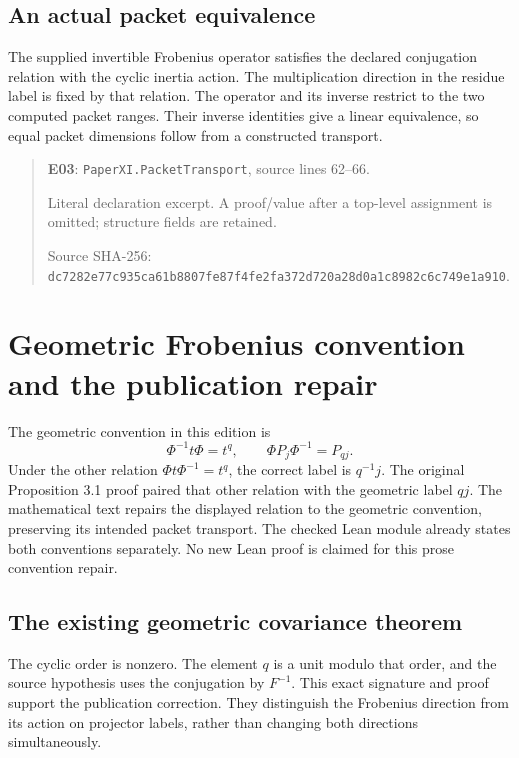 \documentclass[10pt,oneside]{book}
\begin{document}

\subsection{An actual packet equivalence}
\label{guide:E03}
The supplied invertible Frobenius operator satisfies the declared conjugation relation with the cyclic inertia action. The multiplication direction in the residue label is fixed by that relation.
The operator and its inverse restrict to the two computed packet ranges. Their inverse identities give a linear equivalence, so equal packet dimensions follow from a constructed transport.

\begin{quote}\footnotesize\textbf{E03}: \nolinkurl{PaperXI.PacketTransport}, source lines 62--66.\par Literal declaration excerpt. A proof/value after a top-level assignment is omitted; structure fields are retained.\par Source SHA-256: {\scriptsize\texttt{dc7282e77c935ca61b8807fe87f4fe2fa372d720a28d0a1c8982c6c749e1a910}}.\end{quote}


\section{Geometric Frobenius convention and the publication repair}
The geometric convention in this edition is
\[
 \Phi^{-1}t\Phi=t^q,
 \qquad \Phi P_j\Phi^{-1}=P_{qj}.
\]
Under the other relation \(\Phi t\Phi^{-1}=t^q\), the correct label is \(q^{-1}j\). The original Proposition 3.1 proof paired that other relation with the geometric label \(qj\). The mathematical text repairs the displayed relation to the geometric convention, preserving its intended packet transport. The checked Lean module already states both conventions separately. No new Lean proof is claimed for this prose convention repair.

\subsection{The existing geometric covariance theorem}
\label{guide:E04}
The cyclic order is nonzero. The element \(q\) is a unit modulo that order, and the source hypothesis uses the conjugation by \(F^{-1}\).
This exact signature and proof support the publication correction. They distinguish the Frobenius direction from its action on projector labels, rather than changing both directions simultaneously.
\end{document}
